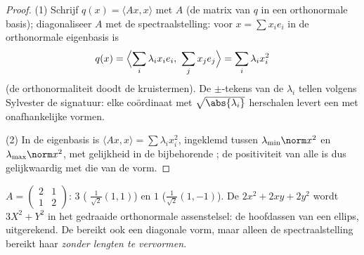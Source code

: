 \begin{proof}
(1) Schrijf $q(x) = \langle A x, x\rangle$ met $A$  (de
matrix van $q$ in een orthonormale basis); diagonaliseer $A$ met de
spectraalstelling: voor $x = \sum x_ie_i$ in de orthonormale
eigenbasis is
\[
q(x) = \Bigl\langle \sum_i \lambda_ix_ie_i,\ \sum_j
x_je_j\Bigr\rangle = \sum_i \lambda_i x_i^2
\]
(de orthonormaliteit doodt de kruistermen). De $\pm$-tekens van de
$\lambda_i$ tellen volgens Sylvester de signatuur: elke coördinaat
met $\sqrt{\abs{\lambda_i}}$ herschalen levert een 
met onafhankelijke vormen.

(2) In de eigenbasis is $\langle Ax, x\rangle = \sum \lambda_i
x_i^2$, ingeklemd tussen $\lambda_{\min}\norm x^2$ en
$\lambda_{\max}\norm x^2$, met gelijkheid in de bijbehorende
; de positiviteit van alle  is dus
gelijkwaardig met die van de vorm.
\end{proof}

\begin{example}\label{ex:b2:quadratic:spectralexample}
$A = \begin{pmatrix} 2 & 1\\ 1 & 2 \end{pmatrix}$:  $3$
( $\frac{1}{\sqrt2}(1,1)$) en $1$
($\frac{1}{\sqrt2}(1,-1)$). De  $2x^2 + 2xy +
2y^2$ wordt $3X^2 + Y^2$ in het gedraaide orthonormale
assenstelsel: de hoofdassen van een ellips, uitgerekend. De
 bereikt ook een diagonale vorm, maar alleen de
spectraalstelling bereikt haar \emph{zonder lengten te
vervormen}.
\end{example}

